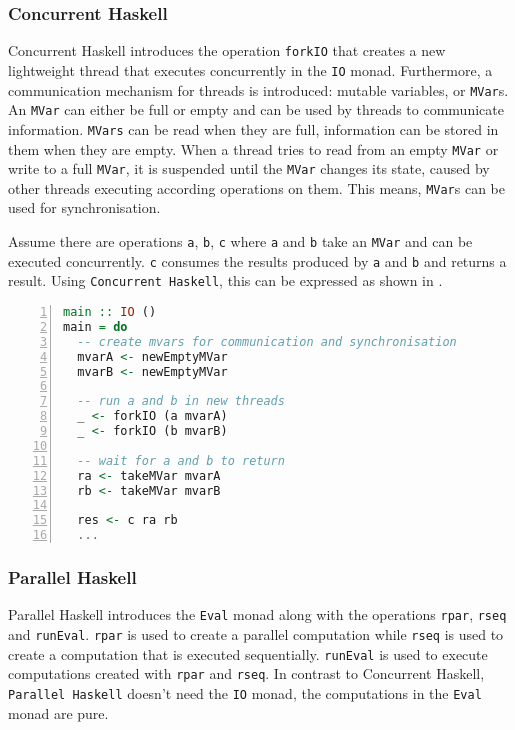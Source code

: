 \subsubsection{Concurrent Haskell}
\textsf{Concurrent Haskell} introduces the operation \texttt{forkIO} that creates a new lightweight thread that executes concurrently in the \texttt{IO} monad. Furthermore, a communication mechanism for threads is introduced: mutable variables, or \texttt{MVar}s. An \texttt{MVar} can either be full or empty and can be used by threads to communicate information. \texttt{MVars} can be read when they are full, information can be stored in them when they are empty. When a thread tries to read from an empty \texttt{MVar} or write to a full \texttt{MVar}, it is suspended until the \texttt{MVar} changes its state, caused by other threads executing according operations on them. This means, \texttt{MVar}s can be used for synchronisation.

Assume there are operations \texttt{a}, \texttt{b}, \texttt{c} where \texttt{a} and \texttt{b} take an \texttt{MVar} and can be executed concurrently. \texttt{c} consumes the results produced by \texttt{a} and \texttt{b} and returns a result. Using \texttt{Concurrent Haskell}, this can be expressed as shown in .

\begin{lstlisting}[language=Haskell, numbers=left, frame=bt, label=lst:example_concurrent_haskell, caption={Parallel and sequential composition in \textsf{Concurrent Haskell}.}]
main :: IO ()
main = do
  -- create mvars for communication and synchronisation
  mvarA <- newEmptyMVar
  mvarB <- newEmptyMVar
  
  -- run a and b in new threads
  _ <- forkIO (a mvarA)
  _ <- forkIO (b mvarB)
  
  -- wait for a and b to return
  ra <- takeMVar mvarA
  rb <- takeMVar mvarB
  
  res <- c ra rb
  ...
\end{lstlisting}

\vspace*{-1em}
\subsubsection{Parallel Haskell}
\textsf{Parallel Haskell} introduces the \texttt{Eval} monad along with the operations \texttt{rpar}, \texttt{rseq} and \texttt{runEval}. \texttt{rpar} is used to create a parallel computation while \texttt{rseq} is used to create a computation that is executed sequentially. \texttt{runEval} is used to execute computations created with \texttt{rpar} and \texttt{rseq}. In contrast to \textsf{Concurrent Haskell}, \texttt{Parallel Haskell} doesn't need the \texttt{IO} monad, the computations in the \texttt{Eval} monad are pure.

